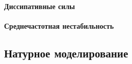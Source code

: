 \paragraph{ Диссипативные силы }

\paragraph{ Среднечастотная нестабильность }

\newpage
\subsection{Натурное моделирование}

\endinput

